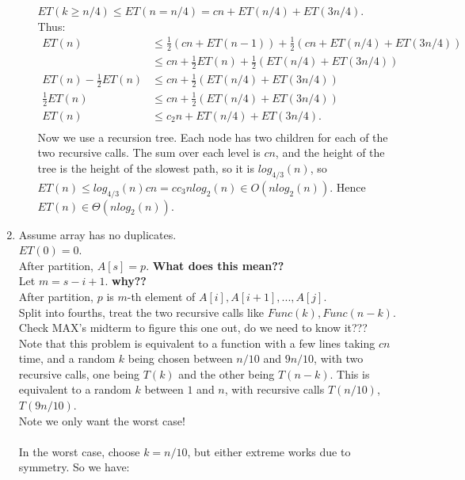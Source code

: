 \documentclass[10pt,oneside,reqno]{amsart}
\theoremstyle{plain}
\theoremstyle{definition}
\begin{document}
\begin{enumerate}[label=\arabic*.]
\begin{enumerate}
$ET(k \geq n/4) \leq ET(n = n/4) = cn + ET(n/4) + ET(3n/4)$. \\
Thus:
\begin{equation}
\begin{aligned}
ET(n) &\leq \frac{1}{2}(cn + ET(n - 1)) + \frac{1}{2}(cn + ET(n/4) + ET(3n/4))\\
&\leq cn + \frac{1}{2}ET(n) + \frac{1}{2}(ET(n/4) + ET(3n/4))\\
ET(n) - \frac{1}{2}ET(n) &\leq cn + \frac{1}{2}(ET(n/4) + ET(3n/4))\\
\frac{1}{2}ET(n) &\leq cn + \frac{1}{2}(ET(n/4) + ET(3n/4))\\
ET(n) &\leq c_2n + ET(n/4) + ET(3n/4).\\
\end{aligned}
\end{equation}
Now we use a recursion tree. Each node has two children for each of the two recursive calls. The sum over each level is $cn$, and the height of the tree is the height of the slowest path, so it is $log_{4/3}(n)$, so $ET(n) \leq log_{4/3}(n)cn = cc_3nlog_2(n) \in O(nlog_2(n))$. Hence $ET(n) \in \Theta(nlog_2(n))$. \\
\end{enumerate}
\item Assume array has no duplicates. \\
$ET(0) = 0$. \\
After partition, $A[s] = p$. \textbf{What does this mean??}\\
Let $m = s -i + 1$. \textbf{why??}\\
After partition, $p$ is $m$-th element of $A[i],A[i + 1],...,A[j]$. \\
Split into fourths, treat the two recursive calls like $Func(k),Func(n - k)$. \\
Check MAX's midterm to figure this one out, do we need to know it???\\
Note that this problem is equivalent to a function with a few lines taking $cn$ time, and a random $k$ being chosen between $n/10$ and $9n/10$, with two recursive calls, one being $T(k)$ and the other being $T(n - k)$. This is equivalent to a random $k$ between $1$ and $n$, with recursive calls $T(n/10)$, $T(9n/10)$. \\
Note we only want the worst case!\\\\
In the worst case, choose $k = n/10$, but either extreme works due to symmetry. So we have: 
\begin{equation}
\begin{aligned}

\end{aligned}
\end{equation}
\end{enumerate}
\end{document}
